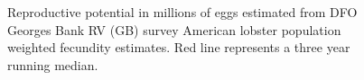 \documentclass[11pt]{article}
\newcommand{\e}{/backup/bio_data/bio.lobster/figures/} %
\begin{document}
\begin{figure}

\centering
\caption{Reproductive potential in millions of eggs estimated from DFO Georges Bank RV (GB) survey American lobster population weighted fecundity estimates. Red line represents a three year running median. }
\end{figure}





%
%
%
\end{document}

